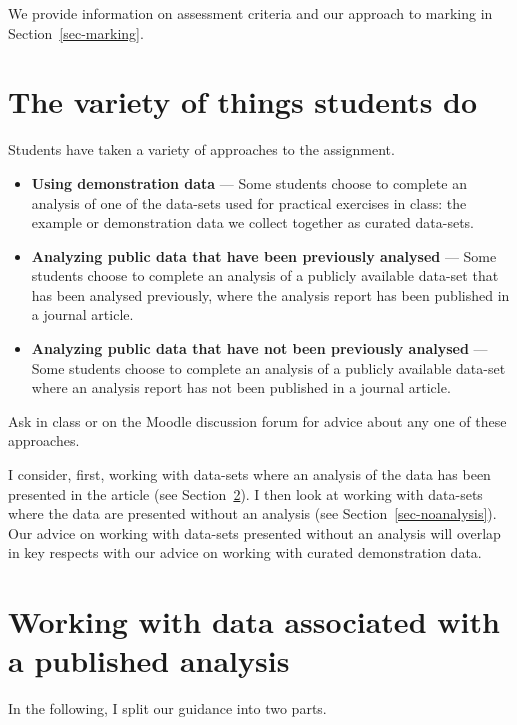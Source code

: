 \documentclass[
  letterpaper,
  DIV=11,
  numbers=noendperiod]{scrreprt}
\providecommand{\tightlist}{%
  \setlength{\itemsep}{0pt}\setlength{\parskip}{0pt}}\usepackage{longtable,booktabs,array}
\begin{document}
We provide information on assessment criteria and our approach to
marking in Section~\ref{sec-marking}.

\hypertarget{sec-how-variety}{%
\section{The variety of things students do}\label{sec-how-variety}}

Students have taken a variety of approaches to the assignment.

\begin{itemize}
\tightlist
\item
  \textbf{Using demonstration data} --- Some students choose to complete
  an analysis of one of the data-sets used for practical exercises in
  class: the example or demonstration data we collect together as
  curated data-sets.
\item
  \textbf{Analyzing public data that have been previously analysed} ---
  Some students choose to complete an analysis of a publicly available
  data-set that has been analysed previously, where the analysis report
  has been published in a journal article.
\item
  \textbf{Analyzing public data that have not been previously analysed}
  --- Some students choose to complete an analysis of a publicly
  available data-set where an analysis report has not been published in
  a journal article.
\end{itemize}

Ask in class or on the Moodle discussion forum for advice about any one
of these approaches.

I consider, first, working with data-sets where an analysis of the data
has been presented in the article (see
Section~\ref{sec-publishedanalysis}). I then look at working with
data-sets where the data are presented without an analysis (see
Section~\ref{sec-noanalysis}). Our advice on working with data-sets
presented without an analysis will overlap in key respects with our
advice on working with curated demonstration data.

\hypertarget{sec-publishedanalysis}{%
\section{Working with data associated with a published
analysis}\label{sec-publishedanalysis}}

In the following, I split our guidance into two parts.
\end{document}
